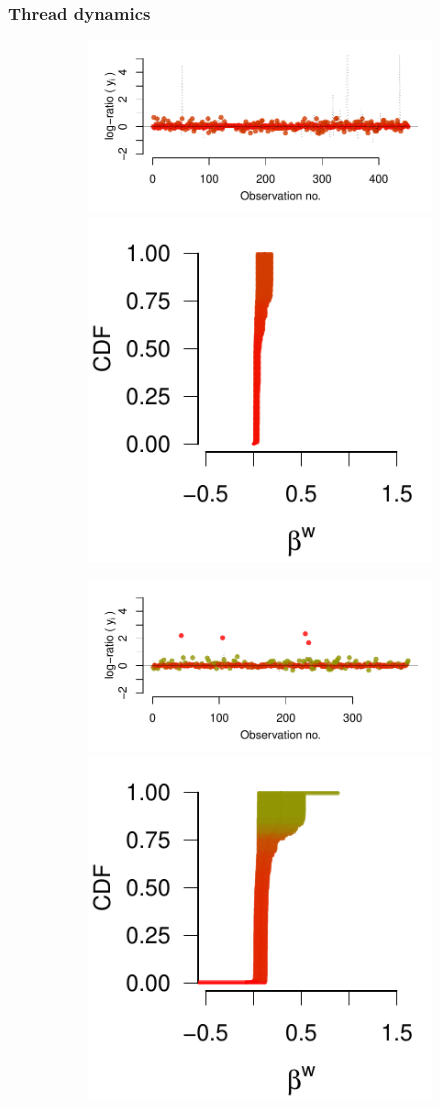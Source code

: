 \documentclass[9pt,a4paper,twocolumn,lineno]{article}
\begin{document}
\subsubsection*{Thread dynamics}
\begin{figure}
	\centering
	\begin{subfigure}{.49\linewidth}
		{\includegraphics[width=.65\linewidth]{threads/thread_history_55_1}\includegraphics[width=.33\linewidth]{betas/beta_history_55_1}	}

		{\includegraphics[width=.65\linewidth]{threads/thread_history_55_3}\includegraphics[width=.33\linewidth]{betas/beta_history_55_3}}
		

\end{subfigure}
\end{figure}
\end{document}
